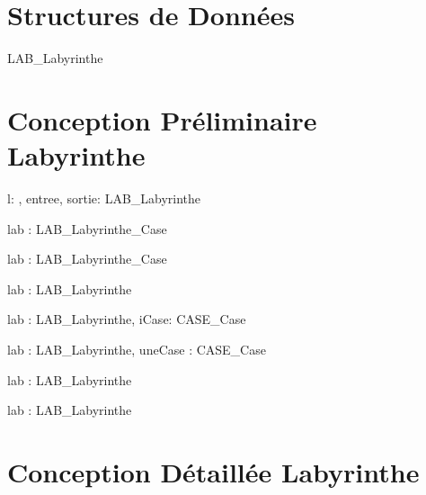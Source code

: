 \documentclass[letterpaper,12pt]{report}
\begin{document}

\section*{Structures de Données}

\begin{algorithme}

\begin{enregistrement}{LAB\_Labyrinthe}
\end{enregistrement}

\end{algorithme}

\section*{Conception Préliminaire Labyrinthe}

\begin{algorithme}
    {l: \naturelNonNul, entree, sortie: \chaine}{LAB\_Labyrinthe}
    {}

    {lab : LAB\_Labyrinthe}{\CASE\_Case}
    {}

    {lab : LAB\_Labyrinthe}{\CASE\_Case}
    {}

    {lab : LAB\_Labyrinthe}{\naturelNonNul}
    {}

    {lab : LAB\_Labyrinthe, iCase: \naturelNonNul}{CASE\_Case}
    {}

    {lab : LAB\_Labyrinthe, uneCase : CASE\_Case}{}
    {}

    {lab : LAB\_Labyrinthe}{\chaine}
    {}

    {lab : LAB\_Labyrinthe}{\chaine}
    {}
\end{algorithme}

\section*{Conception Détaillée Labyrinthe}
\end{document}
